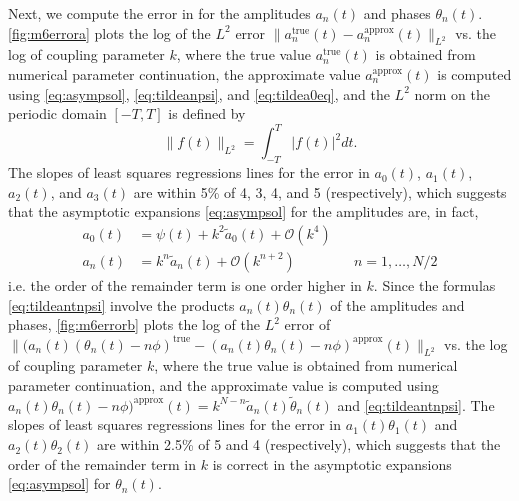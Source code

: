 \documentclass[11pt,reqno]{amsart}
\begin{document}
Next, we compute the error in for the amplitudes $a_n(t)$ and phases $\theta_n(t)$. \cref{fig:m6errora} plots the log of the $L^2$ error $\| a_n^{\text{true}}(t) - a_n^{\text{approx}}(t) \|_{L^2}$ vs. the log of coupling parameter $k$, where the true value $a_n^{\text{true}}(t)$ is obtained from numerical parameter continuation, the approximate value $a_n^{\text{approx}}(t)$ is computed using \cref{eq:asympsol}, \cref{eq:tildeanpsi}, and \cref{eq:tildea0eq}, and the $L^2$ norm on the periodic domain $[-T,T]$ is defined by
\[
\| f(t) \|_{L^2} = \int_{-T}^T |f(t)|^2 dt.
\] 
The slopes of least squares regressions lines for the error in $a_0(t)$, $a_1(t)$, $a_2(t)$, and $a_3(t)$ are within 5\% of 4, 3, 4, and 5 (respectively), which suggests that the asymptotic expansions \cref{eq:asympsol} for the amplitudes are, in fact, 
\begin{equation}\label{eq:asympsol2}
\begin{aligned}
a_0(t) &= \psi(t) + k^2 \tilde{a}_0(t) + \mathcal{O}(k^4) \\
a_n(t) &= k^n \tilde{a}_n(t) + \mathcal{O}(k^{n+2}) && n = 1, \dots, N/2
\end{aligned}
\end{equation}
i.e. the order of the remainder term is one order higher in $k$. Since the formulas \cref{eq:tildeantnpsi} involve the products $a_n(t) \theta_n(t)$ of the amplitudes and phases, \cref{fig:m6errorb} plots the log of the $L^2$ error of $\| (a_n(t) (\theta_n(t) - n \phi)^{\text{true}} - (a_n(t) \theta_n(t)- n \phi)^{\text{approx}}(t) \|_{L^2}$ vs. the log of coupling parameter $k$, where the true value is obtained from numerical parameter continuation, and the approximate value is computed using 
$a_n(t) \theta_n(t) - n \phi )^{\text{approx}}(t) = k^{N-n} \tilde{a}_n(t) \tilde{\theta}_n(t)$ and \cref{eq:tildeantnpsi}. The slopes of least squares regressions lines for the error in $a_1(t)\theta_1(t)$ and $a_2(t)\theta_2(t)$ are within 2.5\% of 5 and 4 (respectively), which suggests that the order of the remainder term in $k$ is correct in the asymptotic expansions \cref{eq:asympsol} for $\theta_n(t)$.
\end{document}
